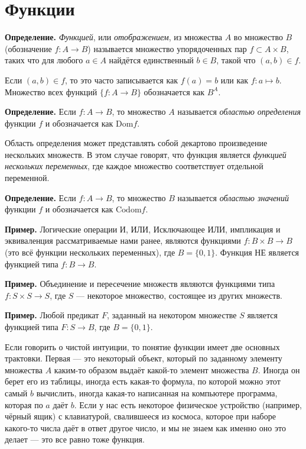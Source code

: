 \section{Функции}

{\bfseries Определение.} {\slshape Функцией}, или {\slshape отображением}, из множества $A$ во множество $B$ (обозначение $f:A\to B$) называется множество упорядоченных пар $f\subset A\times B$, таких что для любого $a\in A$ найдётся единственный $b\in B$, такой что $(a, b) \in f$.

Если $(a, b) \in f$, то это часто записывается как $f(a) = b$ или как $f:a \mapsto b$. Множество всех функций $\{f: A\to B\}$ обозначается как $B^A$.

{\bfseries Определение.} Если $f:A \to B$, то множество $A$ называется {\slshape областью определения} функции $f$ и обозначается как $\mathrm{Dom} f$.

Область определения может представлять собой декартово произведение нескольких множеств. В этом случае говорят, что функция является {\slshape функцией нескольких переменных}, где каждое множество соответствует отдельной переменной.

{\bfseries Определение.} Если $f:A \to B$, то множество $B$ называется {\slshape областью значений} функции $f$ и обозначается как $\mathrm{Codom} f$.

{\bfseries Пример.} Логические операции И, ИЛИ, Исключающее ИЛИ, импликация и эквиваленция рассматриваемые нами ранее, являются функциями $f:B\times B \to B$ (это всё функции нескольких переменных), где $B = \{0, 1\}$. Функция НЕ является функцией типа $f: B \to B$.

{\bfseries Пример.} Объединение и пересечение множеств являются функциями типа $f: S \times S \to S$, где $S$ — некоторое множество, состоящее из других множеств.

{\bfseries Пример.} Любой предикат $F$, заданный на некотором множестве $S$ является функцией типа $F: S \to B$, где $B = \{0, 1\}$.

Если говорить о чистой интуиции, то понятие функции имеет две основных трактовки. Первая — это некоторый объект, который по заданному элементу множества $A$ каким-то образом выдаёт какой-то элемент множества $B$. Иногда он берет его из таблицы, иногда есть какая-то формула, по которой можно этот самый $b$ вычислить, иногда какая-то написанная на компьютере программа, которая по $a$ даёт $b$. Если у нас есть некоторое физическое устройство (например, чёрный ящик) с клавиатурой, свалившееся из космоса, которое при наборе какого-то числа даёт в ответ другое число, и мы не знаем как именно оно это делает — это все равно тоже функция.

